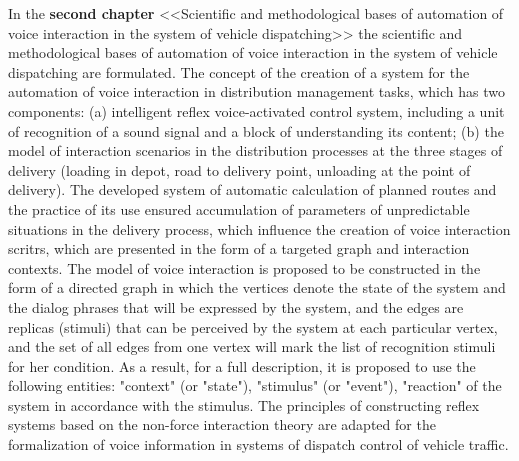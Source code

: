 In the \textbf{second chapter} <<Scientific and methodological bases of automation of voice interaction in the system of vehicle dispatching>> the scientific and methodological bases of automation of voice interaction in the system of vehicle dispatching are formulated.
The concept of the creation of a system for the automation of voice interaction in distribution management tasks, which has two components: (a) intelligent reflex voice-activated control system, including a unit of recognition of a sound signal and a block of understanding its content; (b) the model of interaction scenarios in the distribution processes at the three stages of delivery (loading in depot, road to delivery point, unloading at the point of delivery).
The developed system of automatic calculation of planned routes and the practice of its use ensured accumulation of parameters of unpredictable situations in the delivery process, which influence the creation of voice interaction scritrs, which are presented in the form of a targeted graph and interaction contexts.
The model of voice interaction is proposed to be constructed in the form of a directed graph in which the vertices denote the state of the system and the dialog phrases that will be expressed by the system, and the edges are replicas (stimuli) that can be perceived by the system at each particular vertex, and the set of all edges from one vertex will mark the list of recognition stimuli for her condition. As a result, for a full description, it is proposed to use the following entities: "context" (or "state"), "stimulus" (or "event"), "reaction" of the system in accordance with the stimulus.
The principles of constructing reflex systems based on the non-force interaction theory are adapted for the formalization of voice information in systems of dispatch control of vehicle traffic.


